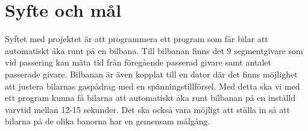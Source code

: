 \section{Syfte och mål}
Syftet med projektet är att programmera ett program som får bilar att automatiskt åka runt på en bilbana.
Till bilbanan finns det 9 segmentgivare som vid passering kan mäta tid från föregående passerad givare samt antalet passerade givare.
Bilbanan är även kopplat till en dator där det finns möjlighet att justera bilarnas gaspådrag med en spänningstillförsel.
Med detta ska vi med ett program kunna få bilarna att automatiskt åka runt bilbanan på en inställd varvtid mellan 12-15 sekunder.
Det ska också vara möjligt att ställa in så att bilarna på de olika banorna har en gemensam målgång.
